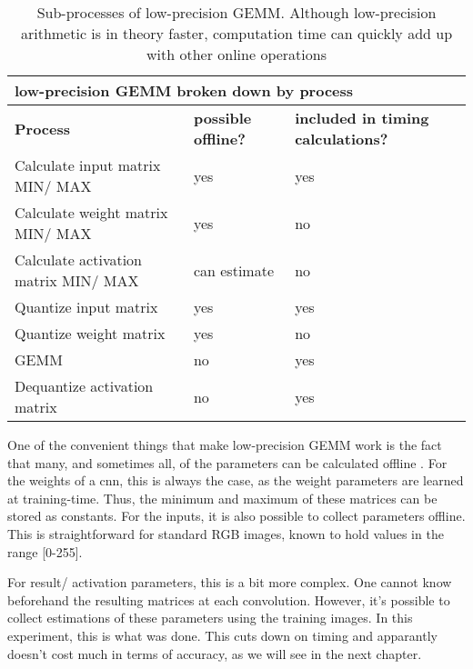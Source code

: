 \begin{table}[]
\centering
\caption[Sub-processes of low-precision GEMM]{Sub-processes of low-precision GEMM. Although low-precision arithmetic is in theory faster, computation time can quickly add up with other online operations}
\label{tbl:gemmlowp}
\begin{tabular}{|l|l|l|}
\hline
\multicolumn{3}{|l|}{low-precision GEMM broken down by process}                                          \\ \hline
\textbf{Process}                & \textbf{possible offline?} & \textbf{included in timing calculations?} \\ \hline
Calculate input matrix MIN/ MAX  & yes		                 & yes                                       \\ \hline
Calculate weight matrix MIN/ MAX & yes                        & no                                        \\ \hline
Calculate activation matrix MIN/ MAX & can estimate              & no                                        \\ \hline
Quantize input matrix           & yes             		     & yes                                       \\ \hline
Quantize weight matrix          & yes                        & no                                        \\ \hline
GEMM                            & no                         & yes                                       \\ \hline
Dequantize activation matrix    & no                         & yes                                       \\ \hline
\end{tabular}
\end{table}

One of the convenient things that make low-precision GEMM work is the fact that many, and sometimes all, of the parameters can be calculated offline \cite{warden_quantize}. For the weights of a cnn, this is always the case, as the weight parameters are learned at training-time. Thus, the minimum and maximum of these matrices can be stored as constants. For the inputs, it is also possible to collect parameters offline. This is straightforward for standard RGB images, known to hold values in the range [0-255].

For result/ activation parameters, this is a bit more complex. One cannot know beforehand the resulting matrices at each convolution. However, it's possible to collect estimations of these parameters using the training images. In this experiment, this is what was done. This cuts down on timing and apparantly doesn't cost much in terms of accuracy, as we will see in the next chapter.

